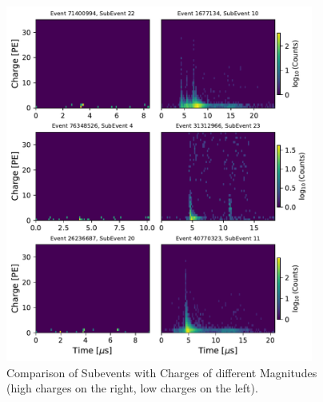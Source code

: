 \begin{figure}[H]
    \centering
    \includegraphics[width=0.9\textwidth]{Plots/heatmaps_lowest_highest_charge_subevents.pdf}
    \caption{Comparison of Subevents with Charges of different Magnitudes (high charges on the right, low charges on the left).}
    \label{fig:high_low_comp}
\end{figure}
    

